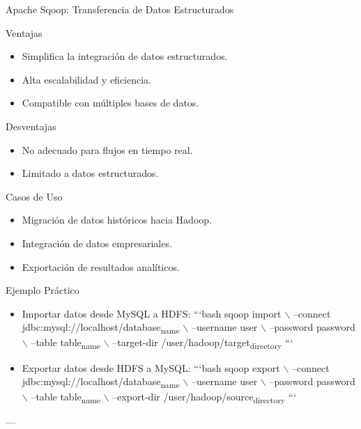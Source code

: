 \documentclass[presentation]{beamer}
\begin{document}
\begin{frame}[label={sec:orge5d0d03}]{Apache Sqoop: Transferencia de Datos Estructurados}
\begin{block}{Ventajas}
\begin{itemize}
\item Simplifica la integración de datos estructurados.
\item Alta escalabilidad y eficiencia.
\item Compatible con múltiples bases de datos.
\end{itemize}
\end{block}

\begin{block}{Desventajas}
\begin{itemize}
\item No adecuado para flujos en tiempo real.
\item Limitado a datos estructurados.
\end{itemize}
\end{block}

\begin{block}{Casos de Uso}
\begin{itemize}
\item Migración de datos históricos hacia Hadoop.
\item Integración de datos empresariales.
\item Exportación de resultados analíticos.
\end{itemize}
\end{block}

\begin{block}{Ejemplo Práctico}
\begin{itemize}
\item \alert{\alert{Importar datos desde MySQL a HDFS}}:
```bash
sqoop import $\backslash$
  --connect jdbc:mysql://localhost/database\textsubscript{name} $\backslash$
  --username user $\backslash$
  --password password $\backslash$
  --table table\textsubscript{name} $\backslash$
  --target-dir /user/hadoop/target\textsubscript{directory}
```
\item \alert{\alert{Exportar datos desde HDFS a MySQL}}:
```bash
sqoop export $\backslash$
  --connect jdbc:mysql://localhost/database\textsubscript{name} $\backslash$
  --username user $\backslash$
  --password password $\backslash$
  --table table\textsubscript{name} $\backslash$
  --export-dir /user/hadoop/source\textsubscript{directory}
```
\end{itemize}

---
\end{block}
\end{frame}
\end{document}
